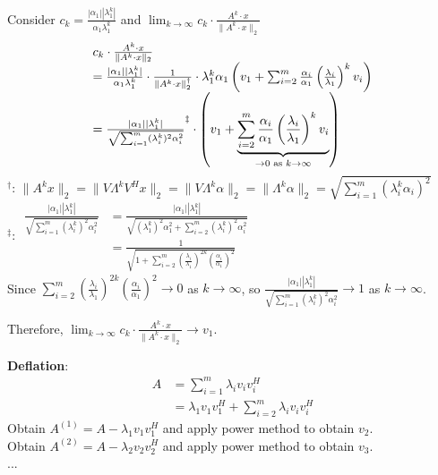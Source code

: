 \begin{multicols}{2}
\[\begin{array}{ll}
    \end{array}
\]
Consider $c_k=\frac{|\alpha_1||\lambda_1^k|}{\alpha_1\lambda_1^k}$ and $\lim_{k\to\infty} c_k\cdot \frac{A^k\cdot x}{\|A^k\cdot x\|_2}$
\[
    \begin{array}{l}
        c_k\cdot \frac{A^k\cdot x}{\|A^k\cdot x\|_2}    \\
        = \frac{|\alpha_1||\lambda_1^k|}{\alpha_1\lambda_1^k}\cdot \frac{1}{\|A^k\cdot x\|_2^\dagger}\cdot \lambda_1^k\alpha_1\left(v_1+\sum_{i=2}^m\frac{\alpha_i}{\alpha_1}\left(\frac{\lambda_i}{\lambda_1}\right)^kv_i\right) \\
        = \frac{|\alpha_1||\lambda_1^k|}{\sqrt{\sum_{i=1}^m (\lambda_i^k)^2 \alpha_i^2}}^\ddagger \cdot \left(v_1+\underbrace{\sum_{i=2}^m\frac{\alpha_i}{\alpha_1}\left(\frac{\lambda_i}{\lambda_1}\right)^kv_i}_{\to 0 \text{ \rm as }k\to \infty}\right) 
    \end{array}
\]
$^\dagger$: $\|A^kx\|_2 = \|V\Lambda^k V^H x\|_2 = \|V\Lambda^k \alpha\|_2 = \|\Lambda^k \alpha\|_2 = \sqrt{\sum_{i=1}^m(\lambda_i^k \alpha_i)^2}$ \\
$^\ddagger$:
$
    \begin{array}{ll}
        \frac{|\alpha_1||\lambda_1^k|}{\sqrt{\sum_{i=1}^m (\lambda_i^k)^2 \alpha_i^2}}  &= \frac{|\alpha_1||\lambda_1^k|}{\sqrt{(\lambda_1^k)^2 \alpha_1^2 + \sum_{i=2}^m (\lambda_i^k)^2 \alpha_i^2}} \\
                                                                                        &= \frac{1}{\sqrt{1+\sum_{i=2}^m \left(\frac{\lambda_i}{\lambda_1}\right)^{2k} \left(\frac{\alpha_i}{\alpha_1}\right)^2}}
    \end{array}
$\\
Since $\sum_{i=2}^m \left(\frac{\lambda_i}{\lambda_1}\right)^{2k} \left(\frac{\alpha_i}{\alpha_1}\right)^2 \to 0$ as $k\to \infty$, so $\frac{|\alpha_1||\lambda_1^k|}{\sqrt{\sum_{i=1}^m (\lambda_i^k)^2 \alpha_i^2}}\to 1$ as $k\to \infty$.

Therefore, $\lim_{k\to\infty} c_k\cdot \frac{A^k\cdot x}{\|A^k\cdot x\|_2}\to v_1$.

\textbf{Deflation}:
\[
    \begin{array}{ll}
        A &= \sum_{i=1}^{m} \lambda_i v_i v_i^H \\
          &= \lambda_1 v_1 v_1^H + \sum_{i=2}^{m} \lambda_i v_i v_i^H
    \end{array}
\]
Obtain $A^{(1)}=A-\lambda_1v_1v_1^H$ and apply power method to obtain $v_2$. \\
Obtain $A^{(2)}=A-\lambda_2v_2v_2^H$ and apply power method to obtain $v_3$. \\
...
\newpage
\end{multicols}